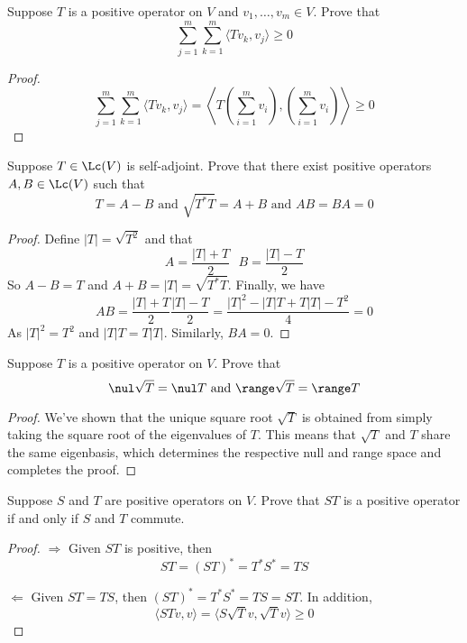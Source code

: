 \documentclass{extarticle}
\begin{document}
\begin{problem}{14}
    Suppose \(T\) is a positive operator on \(V\) and \(v_1, \ldots, v_m \in V\). Prove that
    \[\sum_{j=1}^{m} \sum_{k=1}^{m} \langle Tv_k,v_j \rangle \geq 0\]
\end{problem}

\begin{proof}
\[\sum_{j=1}^{m} \sum_{k=1}^{m} \langle Tv_k,v_j \rangle
= \left\langle T\left(\sum_{i=1}^{m} v_i \right), \left(\sum_{i=1}^{m} v_i \right) \right\rangle \geq 0\]
\end{proof}

\begin{problem}{15}
    Suppose \(T \in \Lc(V)\) is self-adjoint. Prove that there exist positive operators \(A, B
    \in \Lc(V)\) such that
    \[T = A - B \text{ and } \sqrt{T^* T} = A + B \text{ and } AB = BA = 0\]
\end{problem}

\begin{proof}
Define \(|T| = \sqrt{T^2}\) and that
\[A = \frac{|T| + T}{2} \ \ \ B = \frac{|T| - T}{2}\]
So \(A - B = T\) and \(A+B = |T| = \sqrt{T^* T}\). Finally, we have
\[AB = \frac{|T| + T}{2} \frac{|T| - T}{2} = \frac{|T|^2 - |T|T + T|T| - T^2}{4} = 0\]
As \(|T|^2 = T^2\) and \(|T|T = T|T|\). Similarly, \(BA = 0\).
\end{proof}

\begin{problem}{16}
    Suppose \(T\) is a positive operator on \(V\). Prove that
    \[\nul \sqrt{T} = \nul T \text{  and  } \range \sqrt{T} = \range T\]
\end{problem}

\begin{proof}
We've shown that the unique square root \(\sqrt{T}\) is obtained from simply taking the square root
of the eigenvalues of \(T\). This means that \(\sqrt{T}\) and \(T\) share the same eigenbasis, which
determines the respective null and range space and completes the proof.
\end{proof}

\begin{problem}{18}
    Suppose \(S\) and \(T\) are positive operators on \(V\). Prove that \(ST\) is a positive
    operator if and only if \(S\) and \(T\) commute.
\end{problem}

\begin{proof}
\(\Rightarrow\) Given \(ST\) is positive, then
\[ST = (ST)^* = T^* S^* = TS \]

\(\Leftarrow\) Given \(ST = TS\), then \((ST)^* = T^* S^* = TS = ST\). In addition,
\[\langle ST v,v \rangle = \langle S\sqrt{T}v,\sqrt{T}v \rangle \geq 0\]
\end{proof}
\end{document}

